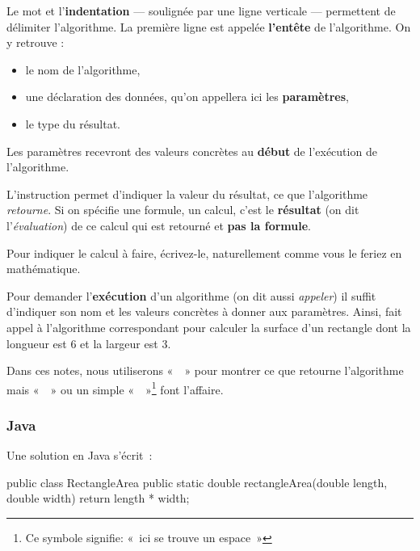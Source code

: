 			Le mot \pc{\algorithmicalgo} et l'\textbf{indentation} — soulignée
			par une ligne verticale — permettent de délimiter l’algorithme.  La
			première ligne est appelée \textbf{l’entête} de
			l’algorithme.  On y retrouve :

			\begin{itemize}
				\item 
					le nom de l’algorithme,
				\item 
					une déclaration des données, 
					qu’on appellera ici les \textbf{paramètres}, 
				\item 
					le type du résultat.
			\end{itemize}
		
			Les paramètres recevront des valeurs concrètes
			au \textbf{début} de l’exécution de l’algorithme. 
		
			L’instruction \pc{\algorithmicreturn}
			permet d’indiquer la valeur du résultat, 
			ce que l’algorithme \emph{retourne}.
			Si on spécifie une formule, un calcul,
			c’est le \textbf{résultat} (on dit l’\emph{évaluation}) 
			de ce calcul qui est retourné et \textbf{pas la formule}.
		
			Pour indiquer le calcul à faire, écrivez-le, naturellement comme
			vous le feriez en mathématique.  
	
			Pour demander l'\textbf{exécution} d'un algorithme (on dit aussi
			\emph{appeler}) il suffit d’indiquer son nom et les valeurs
			concrètes à donner aux paramètres.  Ainsi,
			 fait appel à l’algorithme correspondant
			pour calculer la surface d’un rectangle dont la longueur est $6$ et
			la largeur est $3$.

			Dans ces notes, nous utiliserons «~\pc{$\rightarrow$}~» pour montrer
			ce que retourne l'algorithme mais «~\pc{:}~» ou un simple
			«~\pc{\large\textvisiblespace}~»\footnote{Ce symbole signifie: «~ici
			se trouve un espace~»} font l'affaire.

		\subsubsection{Java}

			Une solution en Java s'écrit~:

			\begin{java}
public class RectangleArea{
	public static double rectangleArea(double length, double width){
		return length * width;
	}
}			
			\end{java}

